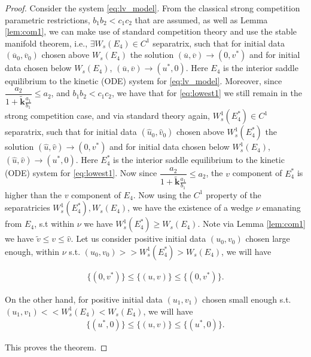 \documentclass[10pt]{amsart}
\theoremstyle{definition}
\begin{document}
\begin{proof}
Consider the system \eqref{eq:lv_model}. From the classical strong competition parametric restrictions, $b_{1}b_{2} < c_{1}c_{2}$ that are assumed, as well as Lemma \ref{lem:com1}, we can make use of standard competition theory and use the stable manifold theorem, i.e., $\exists W_{s}(E_{4}) \in C^{1}$ separatrix, such that for initial data $(\overline{u}_0,\overline{v}_0)$ chosen above $W_{s}(E_{4})$ the solution $(\overline{u},\overline{v}) \to (0,v^*)$ and for initial data chosen below $W_{s}(E_{4})$, $(\overline{u},\overline{v}) \to (u^*,0)$. Here $E_{4}$ is the interior saddle equilibrium to the kinetic (ODE) system for \eqref{eq:lv_model}.
	Moreover, since $\dfrac{a_{2}}{1 + \mathbf{\widetilde{k}}  \frac{a_{1}}{b_{1}}} \le a_{2}$, and $b_{1}b_{2} < c_{1}c_{2}$, we have that for \eqref{eq:lowest1} we still remain in the strong competition case, and via standard theory again, $W^{1}_{s}(E^{*}_{4}) \in C^{1}$ separatrix, such that for initial data $(\widehat{u}_0,\widehat{v}_0)$ chosen above $W^{1}_{s}(E^{*}_{4})$ the solution $(\widehat{u},\widehat{v}) \to (0,v^*)$ and for initial data chosen below $W^{1}_{s}(E_{4})$, $(\widehat{u},\widehat{v})\to (u^*,0)$. Here $E^{*}_{4}$ is the interior saddle equilibrium to the kinetic (ODE) system for \eqref{eq:lowest1}.
Now since $\dfrac{a_{2}}{1 + \mathbf{\widetilde{k}}  \frac{a_{1}}{b_{1}}} \le a_{2}$, the $v$ component of $E^{*}_{4}$ is higher than the $v$ component of $E_{4}$. Now using the $C^{1}$ property of the separatricies $W^{1}_{s}(E^{*}_{4}) , W_{s}(E_{4})$, we have the existence of a wedge $\nu$ emanating from $E_{4}$, s.t within $\nu$ we have $W^{1}_{s}(E^{*}_{4}) \geq W_{s}(E_{4})$. Note via Lemma \ref{lem:com1} we have $ \tilde{v} \leq v \leq \widehat{v}$.	Let us consider positive initial data $(u_0,v_0)$ chosen large enough, within $\nu$ s.t. $(u_0,v_0) >> W^{1}_{s}(E^{*}_{4}) > W_{s}(E_{4})$, we will have 
	
	\begin{align*}
	\Big\{  (0,v^*) \Big\} \le \Big\{ (u,v) \Big\} \le \Big\{ (0,v^*) \Big\}.
	\end{align*}
	
	On the other hand,  for positive initial data $(u_1,v_1)$ chosen small enough s.t. $(u_1,v_1) << W^{1}_{s}(E_{4}) < W_{s}(E_{4})$, we will have 
	\begin{align*}
	\Big\{  (u^*,0)\Big\} \le \Big\{ (u,v) \Big\} \le \Big\{ (u^*,0) \Big\}.
	\end{align*}
	
	This proves the theorem.
	
	
	
\end{proof}
\end{document}
